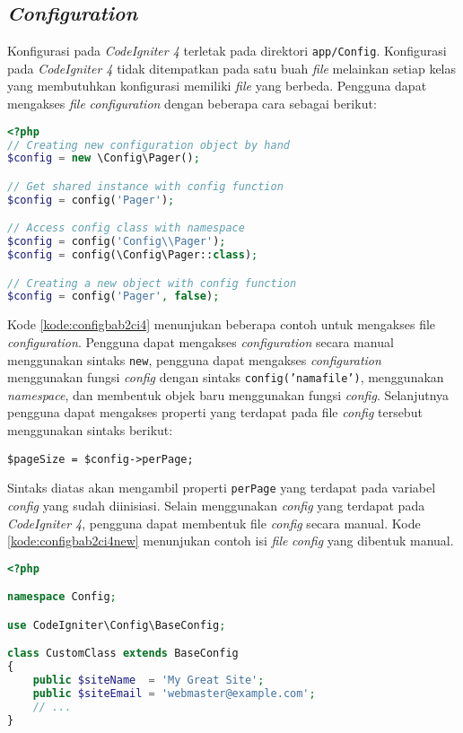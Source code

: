 \subsection{\textit{Configuration}}
Konfigurasi pada \textit{CodeIgniter 4} terletak pada direktori \texttt{app/Config}. Konfigurasi pada \textit{CodeIgniter 4} tidak ditempatkan pada satu buah \textit{file} melainkan setiap kelas yang membutuhkan konfigurasi memiliki \textit{file} yang berbeda. Pengguna dapat mengakses \textit{file} \textit{configuration} dengan beberapa cara sebagai berikut:
\begin{lstlisting}[language=PHP, caption=Contoh mengakses file \textit{configuration}. ,label=kode:configbab2ci4]
<?php
// Creating new configuration object by hand
$config = new \Config\Pager();

// Get shared instance with config function
$config = config('Pager');

// Access config class with namespace
$config = config('Config\\Pager');
$config = config(\Config\Pager::class);

// Creating a new object with config function
$config = config('Pager', false);
\end{lstlisting}
Kode \ref{kode:configbab2ci4} menunjukan beberapa contoh untuk mengakses file \textit{configuration}. Pengguna dapat mengakses \textit{configuration} secara manual menggunakan sintaks \texttt{new}, pengguna dapat mengakses \textit{configuration} menggunakan fungsi \textit{config} dengan sintaks \texttt{config('namafile')}, menggunakan \textit{namespace}, dan membentuk objek baru menggunakan fungsi \textit{config}. Selanjutnya pengguna dapat mengakses properti yang terdapat pada file \textit{config} tersebut menggunakan sintaks berikut:
\begin{center}
	\verb|$pageSize = $config->perPage;|
\end{center}
Sintaks diatas akan mengambil properti \texttt{perPage} yang terdapat pada variabel \textit{config} yang sudah diinisiasi. Selain menggunakan \textit{config} yang terdapat pada \textit{CodeIgniter 4}, pengguna dapat membentuk file \textit{config} secara manual. Kode \ref{kode:configbab2ci4new} menunjukan contoh isi \textit{file} \textit{config} yang dibentuk manual.
\begin{lstlisting}[language=PHP, caption=Contoh pembentukan file \textit{configuration}. ,label=kode:configbab2ci4new]
<?php

namespace Config;

use CodeIgniter\Config\BaseConfig;

class CustomClass extends BaseConfig
{
    public $siteName  = 'My Great Site';
    public $siteEmail = 'webmaster@example.com';
    // ...
}
\end{lstlisting}
